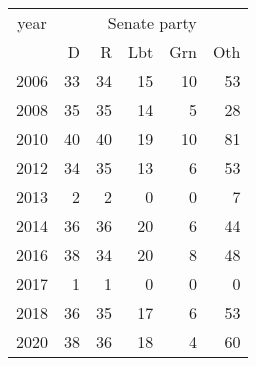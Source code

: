 \footnotesize\begin{tabular}[t]{lrrrrr}
\toprule
\multicolumn{1}{c}{year} & \multicolumn{5}{c}{Senate party} \\
\cmidrule(l{3pt}r{3pt}){1-1} \cmidrule(l{3pt}r{3pt}){2-6}
  & D & R & Lbt & Grn & Oth\\
\midrule
2006 & 33 & 34 & 15 & 10 & 53\\
2008 & 35 & 35 & 14 & 5 & 28\\
2010 & 40 & 40 & 19 & 10 & 81\\
2012 & 34 & 35 & 13 & 6 & 53\\
2013 & 2 & 2 & 0 & 0 & 7\\
2014 & 36 & 36 & 20 & 6 & 44\\
2016 & 38 & 34 & 20 & 8 & 48\\
2017 & 1 & 1 & 0 & 0 & 0\\
2018 & 36 & 35 & 17 & 6 & 53\\
2020 & 38 & 36 & 18 & 4 & 60\\
\bottomrule
\end{tabular}
